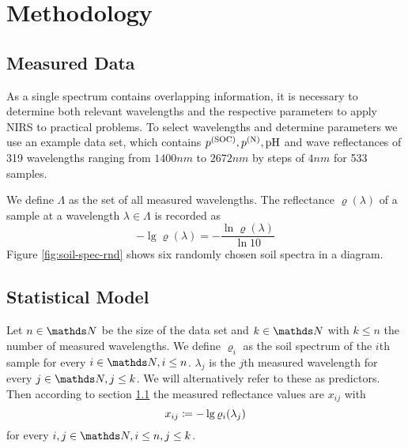 \section{Methodology}
\label{sec:methodology}
	
	\subsection{Measured Data}
	\label{ssec:measured-data}
	
		As a single spectrum contains overlapping information, it is necessary to determine both relevant wavelengths and the respective parameters to apply NIRS to practical problems.
		To select wavelengths and determine parameters we use an example data set, which contains $p^{\mathrm{(SOC)}},p^{\mathrm{(N)}},\mathrm{pH}$ and wave reflectances of 319 wavelengths ranging from $1400 \unit{nm}$ to $2672 \unit{nm}$ by steps of $4 \unit{nm}$ for 533 samples.%

		We define $\Lambda$ as the set of all measured wavelengths. The reflectance $\varrho(\lambda)$ of a sample at a wavelength $\lambda \in \Lambda$ is recorded as
		\[
			-\lg \varrho(\lambda) = -\frac{\ln \varrho(\lambda)}{\ln 10}
		\]
		Figure \ref{fig:soil-spec-rnd} shows six randomly chosen soil spectra in a diagram.
		\begin{figure*}
			\centering
			
			\caption{Six near infrared soil spectra of randomly chosen soil samples obtained from the data set, where $\lambda$ is the wavelength and $\rho(\lambda)$ the corresponding reflectance and each colour refers to one sample}
			\label{fig:soil-spec-rnd}
		\end{figure*}
		
	

	\subsection{Statistical Model}
	\label{ssec:statistical-model}
	
		Let $n\in\SN$ be the size of the data set and $k\in\SN$ with $k\leq n$ the number of measured wavelengths. We define
		$\varrho_i$ as the soil spectrum of the $i$th sample for every $i\in\SN,i\leq n$.
		$\lambda_j$ is the $j$th measured wavelength for every $j\in\SN,j\leq k$. We will alternatively refer to these as predictors.%
		Then according to section \ref{ssec:measured-data} the measured reflectance values are $x_{ij}$ with
		\[
			x_{ij} \coloneqq -\lg \varrho_i(\lambda_j)
		\]
		for every $i,j\in\SN,i\leq n,j\leq k$.
		
